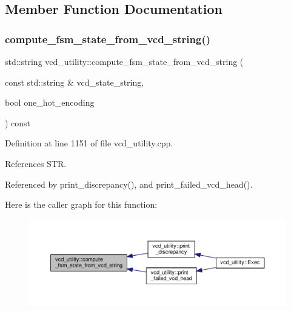 \subsection{Member Function Documentation}
\mbox{\label{classvcd__utility_a0871f81ef5071712b79ea90d3831579c}} 
\subsubsection{\texorpdfstring{compute\+\_\+fsm\+\_\+state\+\_\+from\+\_\+vcd\+\_\+string()}{compute\_fsm\_state\_from\_vcd\_string()}}
{\footnotesize\ttfamily std\+::string vcd\+\_\+utility\+::compute\+\_\+fsm\+\_\+state\+\_\+from\+\_\+vcd\+\_\+string (\begin{DoxyParamCaption}\item[{const std\+::string \&}]{vcd\+\_\+state\+\_\+string,  }\item[{bool}]{one\+\_\+hot\+\_\+encoding }\end{DoxyParamCaption}) const\hspace{0.3cm}{\ttfamily [protected]}}



Definition at line 1151 of file vcd\+\_\+utility.\+cpp.



References S\+TR.



Referenced by print\+\_\+discrepancy(), and print\+\_\+failed\+\_\+vcd\+\_\+head().

Here is the caller graph for this function\+:
\nopagebreak
\begin{figure}[H]
\begin{center}
\leavevmode
\includegraphics[width=350pt]{d8/d51/classvcd__utility_a0871f81ef5071712b79ea90d3831579c_icgraph}
\end{center}
\end{figure}
\mbox{\label{classvcd__utility_a7c4de52630a3e3fa46286ffae1b94060}} 
